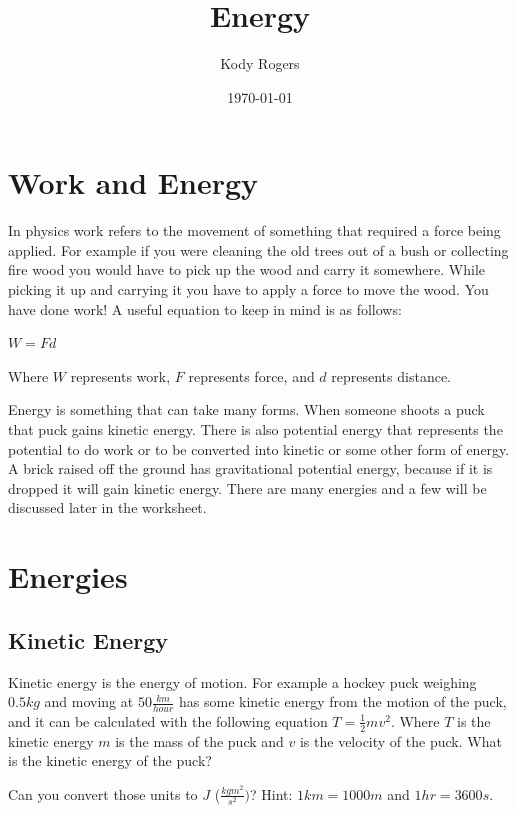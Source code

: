 \documentclass[12pt]{article}
\title{Energy}
\author{Kody Rogers}
\date{\today}
\begin{document}
\maketitle
\thispagestyle{empty}

\section{Work and Energy}
In physics work refers to the movement of something that required a force being applied. For example if you were cleaning the old trees out of a bush or collecting fire wood you would have to pick up the wood and carry it somewhere. While picking it up and carrying it you have to apply a force to move the wood. You have done work! A useful equation to keep in mind is as follows:

$W = Fd$

Where $W$ represents work, $F$ represents force, and $d$ represents distance.

Energy is something that can take many forms. When someone shoots a puck that puck gains kinetic energy. There is also potential energy that represents the potential to do work or to be converted into kinetic or some other form of energy. A brick raised off the ground has gravitational potential energy, because if it is dropped it will gain kinetic energy. There are many energies and a few will be discussed later in the worksheet.

\section{Energies}
\subsection{Kinetic Energy}
Kinetic energy is the energy of motion. For example a hockey puck weighing $0.5kg$ and moving at $50 \frac{km}{hour}$ has some kinetic energy from the motion of the puck, and it can be calculated with the following equation $T = \frac{1}{2}mv^2$. Where $T$ is the kinetic energy $m$ is the mass of the puck and $v$ is the velocity of the puck. What is the kinetic energy of the puck?

\parbox[][6cm][t]{8cm}{}


Can you convert those units to $J$ ($\frac{kgm^2}{s^2})$? Hint: $1km = 1000m$ and $1hr = 3600s$.

\parbox[][6cm][t]{8cm}{}
\end{document}

